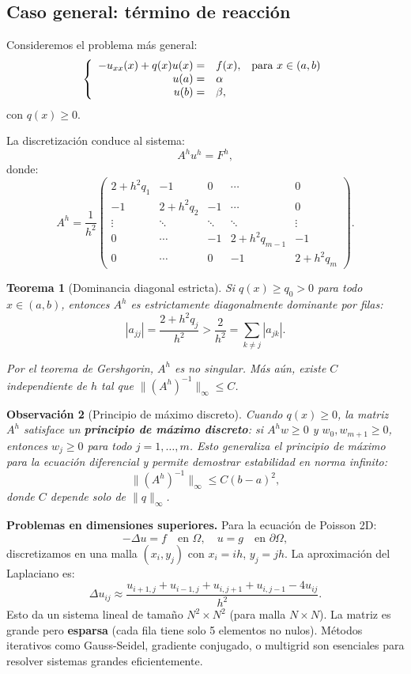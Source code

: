 \documentclass[a4paper,11pt]{report}
\newtheorem{theorem}{Teorema}[chapter]
\newtheorem{remark}[theorem]{Observación}
\begin{document}
\subsection{Caso general: término de reacción}

Consideremos el problema más general:
\begin{equation}
\label{pvc_general}
\left\lbrace
  \begin{array}{r l c}
      -u_{xx}(x) + q(x)u(x) = & f(x), & \mbox{para } x \in (a,b) \\
      u(a) = & \alpha & \\
      u(b) = & \beta, &
      \end{array}
    \right.
\end{equation}
con $q(x) \geq 0$.

La discretización conduce al sistema:
\[
A^h u^h = F^h,
\]
donde:
\[
A^h = \frac{1}{h^2}\begin{pmatrix}
2 + h^2 q_1 & -1 & 0 & \cdots & 0 \\
-1 & 2 + h^2 q_2 & -1 & \cdots & 0 \\
\vdots & \ddots & \ddots & \ddots & \vdots \\
0 & \cdots & -1 & 2 + h^2 q_{m-1} & -1 \\
0 & \cdots & 0 & -1 & 2 + h^2 q_m
\end{pmatrix}.
\]

\begin{theorem}[Dominancia diagonal estricta]
Si $q(x) \geq q_0 > 0$ para todo $x \in (a,b)$, entonces $A^h$ es estrictamente diagonalmente dominante por filas:
\[
|a_{jj}| = \frac{2 + h^2 q_j}{h^2} > \frac{2}{h^2} = \sum_{k \neq j} |a_{jk}|.
\]

Por el teorema de Gershgorin, $A^h$ es no singular. Más aún, existe $C$ independiente de $h$ tal que $\|(A^h)^{-1}\|_\infty \leq C$.
\end{theorem}

\begin{remark}[Principio de máximo discreto]
Cuando $q(x) \geq 0$, la matriz $A^h$ satisface un \textbf{principio de máximo discreto}: si $A^h w \geq 0$ y $w_0, w_{m+1} \geq 0$, entonces $w_j \geq 0$ para todo $j = 1, \ldots, m$. Esto generaliza el principio de máximo para la ecuación diferencial y permite demostrar estabilidad en norma infinito:
\[
\| (A^h)^{-1} \|_\infty \leq C(b-a)^2,
\]
donde $C$ depende solo de $\|q\|_\infty$.
\end{remark}

\textbf{Problemas en dimensiones superiores.} Para la ecuación de Poisson 2D:
\[
-\Delta u = f \quad \text{en } \Omega, \quad u = g \quad \text{en } \partial\Omega,
\]
discretizamos en una malla $(x_i, y_j)$ con $x_i = ih$, $y_j = jh$. La aproximación del Laplaciano es:
\[
\Delta u_{ij} \approx \frac{u_{i+1,j} + u_{i-1,j} + u_{i,j+1} + u_{i,j-1} - 4u_{ij}}{h^2}.
\]
Esto da un sistema lineal de tamaño $N^2 \times N^2$ (para malla $N \times N$). La matriz es grande pero \textbf{esparsa} (cada fila tiene solo 5 elementos no nulos). Métodos iterativos como Gauss-Seidel, gradiente conjugado, o multigrid son esenciales para resolver sistemas grandes eficientemente.
\end{document}
